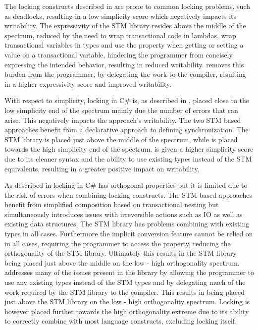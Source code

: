 The locking constructs described in  are prone to common locking problems, such as deadlocks, resulting in a low simplicity score which negatively impacts its writability. The expressivity of the \ac{STM} library resides above the middle of the spectrum, reduced by the need to wrap transactional code in lambdas, wrap transactional variables in  types and use the  property when getting or setting a value on a transactional variable, hindering the programmer from concisely expressing the intended behavior, resulting in reduced writability. \stmname removes this burden from the programmer, by delegating the work to the compiler, resulting in a higher expressivity score and improved writability.

With respect to simplicity, locking in C\# is, as described in , placed close to the low simplicity end of the spectrum mainly due the number of errors that can arise. This negatively impacts the approach's writability. The two \ac{STM} based approaches benefit from a declarative approach to defining synchronization. The \ac{STM} library is placed just above the middle of the spectrum, while \stmname is placed towards the high simplicity end of the spectrum. \stmname is given a higher simplicity score due to its cleaner syntax and the ability to use existing types instead of the \ac{STM} equivalents, resulting in a greater positive impact on writability.

As described in  locking in C\# has orthogonal properties but it is limited due to the risk of errors when combining locking constructs. The \ac{STM} based approaches benefit from simplified composition based on transactional nesting but simultaneously introduces issues with irreversible actions such as \ac{IO} as well as existing data structures. The \ac{STM} library has problems combining with existing types in all cases. Furthermore the implicit conversion feature cannot be relied on in all cases, requiring the programmer to access the  property, reducing the orthogonality of the \ac{STM} library. Ultimately this results in the \ac{STM} library being placed just above the middle on the low - high orthogonality spectrum. \stmname addresses many of the issues present in the  library  by allowing the programmer to use any existing types instead of the \ac{STM} types and by delegating much of the work required by the \ac{STM} library to the compiler. This results in \stmname being placed just above the \ac{STM} library on the  low - high orthogonality spectrum. Locking is however placed further towards the high orthogonality extreme due to its ability to correctly combine with most language constructs, excluding locking itself.  

